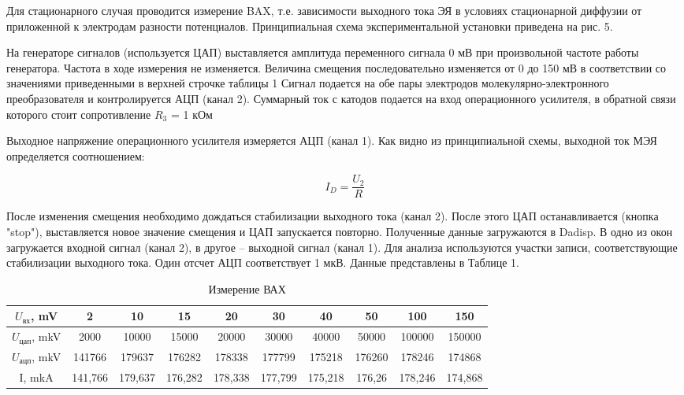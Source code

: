 \documentclass[a4paper,12pt]{article}
\begin{document}
\newpage

Для стационарного случая проводится измерение BAX, т.е. зависимости выходного тока ЭЯ в условиях стационарной диффузии от приложенной к электродам разности потенциалов. Принципиальная схема экспериментальной установки приведена на рис. 5.

На генераторе сигналов (используется ЦАП) выставляется амплитуда переменного сигнала 0 мВ при произвольной частоте работы генератора. Частота в ходе измерения не изменяется. Величина смещения последовательно изменяется от 0 до 150 мВ в соответствии со значениями приведенными в верхней строчке таблицы 1 Сигнал подается на обе пары электродов молекулярно-электронного преобразователя и контролируется АЦП (канал 2). Суммарный ток с катодов подается на вход операционного усилителя, в обратной связи
которого стоит сопротивление $R_3$ = 1 кОм 

Выходное напряжение операционного усилителя измеряется АЦП (канал 1). Как видно из принципиальной схемы, выходной ток МЭЯ определяется соотношением:

\[
I_D = \frac{U_2}{R}
\]

После изменения смещения необходимо дождаться стабилизации выходного тока (канал 2). После этого ЦАП останавливается (кнопка "stop"), выставляется новое значение смещения и ЦАП запускается повторно. Полученные данные загружаются в Dadisp. В одно из окон загружается входной сигнал (канал 2), в другое -- выходной сигнал (канал 1). Для анализа используются участки записи, соответствующие стабилизации выходного тока. Один отсчет АЦП соответствует 1 мкВ. Данные представлены в Таблице 1.

\begin{table}[h]
\begin{center}
\caption{Измерение ВАХ}
\begin{tabular}{|cl|cl|c|c|c|c|c|c|c|c|}
\hline
\multicolumn{2}{|c|}{$U_{вх}$, mV}   & \multicolumn{2}{c|}{2}       & 10      & 15      & 20      & 30      & 40      & 50     & 100     & 150     \\ \hline
\multicolumn{2}{|c|}{$U_{цап}$, mkV} & \multicolumn{2}{c|}{2000}    & 10000   & 15000   & 20000   & 30000   & 40000   & 50000  & 100000  & 150000  \\ \hline
\multicolumn{2}{|c|}{$U_{ацп}$, mkV} & \multicolumn{2}{c|}{141766}  & 179637  & 176282  & 178338  & 177799  & 175218  & 176260 & 178246  & 174868  \\ \hline
\multicolumn{2}{|c|}{I, mkA}      & \multicolumn{2}{c|}{141,766} & 179,637 & 176,282 & 178,338 & 177,799 & 175,218 & 176,26 & 178,246 & 174,868 \\ \hline
\end{tabular}
\end{center}
\end{table}
\end{document}
